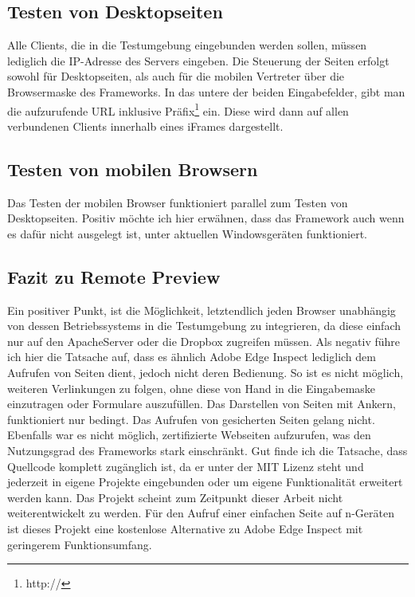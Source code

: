 		\subsection{Testen von Desktopseiten}
		Alle Clients, die in die Testumgebung eingebunden werden sollen, müssen lediglich die IP-Adresse des Servers eingeben.
		Die Steuerung der Seiten erfolgt sowohl für Desktopseiten, als auch für die mobilen Vertreter über die Browsermaske des Frameworks. In das untere der beiden Eingabefelder, gibt man die aufzurufende URL inklusive Präfix\footnote{http://} ein. Diese wird dann auf allen verbundenen Clients innerhalb eines iFrames dargestellt. 
				
		 \subsection{Testen von mobilen Browsern}
		 Das Testen der mobilen Browser funktioniert parallel zum Testen von Desktopseiten. Positiv möchte ich hier erwähnen, dass das Framework auch wenn es dafür nicht ausgelegt ist, unter aktuellen Windowsgeräten funktioniert.			
		
		\subsection{Fazit zu Remote Preview}
		Ein positiver Punkt, ist die Möglichkeit, letztendlich jeden Browser unabhängig von dessen Betriebssystems in die 				Testumgebung zu integrieren, da diese einfach nur auf den ApacheServer oder die Dropbox zugreifen müssen. Als negativ führe ich hier die Tatsache auf, dass es ähnlich Adobe Edge Inspect lediglich dem Aufrufen von Seiten dient, jedoch nicht deren Bedienung. So ist es nicht möglich, weiteren Verlinkungen zu folgen, ohne diese von Hand in die Eingabemaske einzutragen oder Formulare auszufüllen. Das Darstellen von Seiten mit Ankern, funktioniert nur bedingt. Das Aufrufen von gesicherten Seiten gelang nicht. Ebenfalls war es nicht möglich, zertifizierte Webseiten aufzurufen, was den Nutzungsgrad des Frameworks stark einschränkt. Gut finde ich die Tatsache, dass Quellcode komplett zugänglich ist, da er 		unter der MIT Lizenz steht und	jederzeit in eigene Projekte eingebunden oder um eigene Funktionalität erweitert werden kann. Das Projekt scheint zum Zeitpunkt dieser Arbeit nicht weiterentwickelt zu werden. Für den Aufruf einer einfachen Seite auf n-Geräten ist dieses Projekt eine kostenlose Alternative zu Adobe Edge Inspect mit geringerem Funktionsumfang.
		

